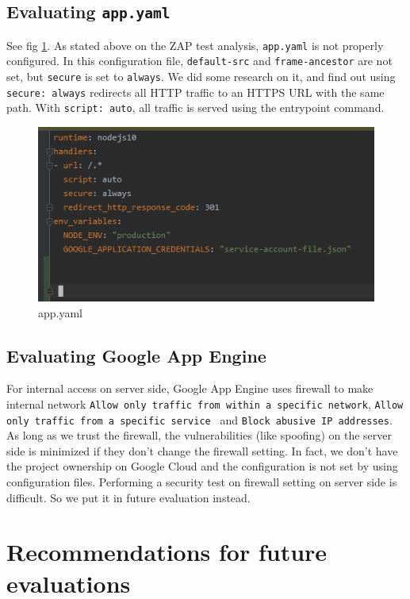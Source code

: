\documentclass[12pt, a4paper]{article}
\newcommand{\code}[1]{\texttt{#1}}
\begin{document}
\subsection{Evaluating \code{app.yaml}}
See fig \ref{fig:app.yaml}. As stated above on the ZAP test analysis, \code{app.yaml} is not properly configured. In this configuration file, \code{default-src} and \code{frame-\linebreak[1] ancestor} are not set, but \code{secure} is set to \code{always}.
We did some research on it, and find out using \code{secure: always} redirects all HTTP traffic to an HTTPS URL with the same path. With \code{script: auto}, all traffic is served using the entrypoint command.


\begin{figure}[ht]
\centering
\includegraphics[width=\textwidth]{app_yaml.png}
\caption{app.yaml}
\label{fig:app.yaml}
\end{figure}

\subsection{Evaluating Google App Engine}
For internal access on server side, Google App Engine uses firewall to make internal network \code{Allow only traffic from within a specific network}, \code{Allow only traffic from a specific service
} and \code{Block abusive IP addresses}. As long as we trust 
the firewall, the vulnerabilities (like spoofing) on the server side is minimized if they don't change the firewall setting. In fact, we don't have the project ownership on Google Cloud and the configuration is not set by using configuration files. Performing a security test on firewall setting on server side is difficult. So we put it in future evaluation instead.



\section{Recommendations for future evaluations}
\end{document}
